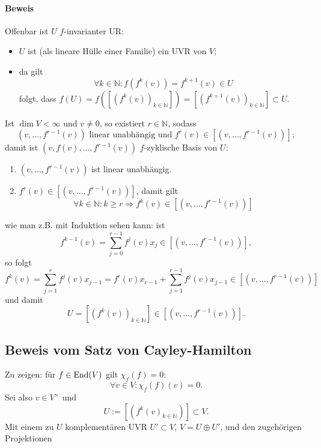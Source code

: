\paragraph{Beweis}
	Offenbar ist $ U $ $ f $-invarianter UR:
	\begin{itemize}
		\item $ U $ ist (als lineare Hülle einer Familie) ein UVR von $ V $;
		\item da gilt
			\[ \forall k\in \mathbb{N}: f\left(f^k(v)\right)=f^{k+1}(v)\in U \]
			folgt, dass $ f(U) = f\left(\left[\left(f^k(v)\right)_{k\in{\mathbb{N}}}\right]\right) = \left[\left(f^{k+1}(v)\right)_{k\in{\mathbb{N}}}\right]\subset U. $
	\end{itemize}
	Ist $ \dim V < \infty $ und $ v\neq 0 $, so existiert $ r\in \mathbb{N} $, sodass
		\[ \left(v,\dots,f^{r-1}(v)\right) \text{ linear unabhängig und }f^r(v)\in\left[\left(v,\dots,f^{r-1}(v)\right)\right]; \]
	damit ist $ \left(v,f(v),\dots, f^{r-1}(v)\right) $ $ f $-zyklische Basis von $ U $:
	\begin{enumerate}
		\item $ \left(v,\dots,f^{r-1}(v) \right) $ ist linear unabhängig.
		\item $ f^r(v) \in \left[\left(v,\dots,f^{r-1}(v)\right)\right]$, damit gilt
		\[ \forall k\in \mathbb{N}: k\geq r \Rightarrow f^k(v)\in \left[\left(v,\dots,f^{r-1}(v)\right)\right] \]
	\end{enumerate}
	wie man z.B. mit Induktion sehen kann: ist
		\[ f^{k-1}(v) = \sum_{j=0}^{r-1}f^j(v)x_j \in \left[\left(v,\dots,f^{r-1}(v)\right) \right], \]
	so folgt
		\[ f^k(v) = \sum_{j=1}^{r}f^j(v)x_{j-1}=f^{r}(v)x_{r-1}+\sum_{j=1}^{r-1}f^j(v)x_{j-1}\in \left[\left(v,\dots,f^{r-1}(v)\right)\right] \]
	und damit
		\[ U = \left[\left(f^k(v)\right)_{k\in \mathbb{N}}\right]\in \left[\left(v,\dots,f^{r-1}(v)\right)\right]. \]
		
\subsection{Beweis vom Satz von Cayley-Hamilton}
	Zu zeigen: für $ f\in \operatorname{End}(V) $ gilt $ \chi_f(f)=0 $:
		\[ \forall v\in V:\chi_f(f)(v) = 0. \]
	Sei also $ v\in V^\times $ und
		\[ U := \left[\left( f^k(v)_{k\in \mathbb{N}}\right)\right]\subset V. \]
	Mit einem zu $ U $ komplementären UVR $ U'\subset V $, $ V=U\oplus U' $, und den zugehörigen Projektionen
	

